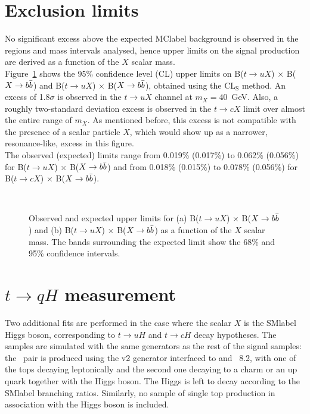 \clearpage

\section{Exclusion limits}

No significant excess above the expected \acrshort{MClabel} background is observed in the regions and mass intervals analysed, hence upper limits on the signal production are derived as a function of the $X$ scalar mass.\\

Figure~\ref{tqX:xseclimits} shows the 95\% confidence level (CL) upper limits on B($t\to uX$) $\times$ B($X\to b\bar{b}$) and B($t\to uX$) $\times$ B($X\to b\bar{b}$), obtained using the CL$_\text{S}$ method. An excess of 1.8$\sigma$ is observed in the $t\to uX$ channel at $m_X=40$~GeV. Also, a roughly two-standard deviation excess is observed in the $t\to cX$ limit over almost the entire range of $m_X$. As mentioned before, this excess is not compatible with the presence of a scalar particle $X$, which would show up as a narrower, resonance-like, excess in this figure.\\

The observed (expected) limits range from 0.019\% (0.017\%) to 0.062\% (0.056\%) for B($t\to uX$) $\times$ B($X\to b\bar{b}$) and from 0.018\% (0.015\%) to 0.078\% (0.056\%) for B($t\to cX$) $\times$ B($X\to b\bar{b}$).\\

\begin{figure}[htb]
    \RawFloats
    \centering
    \\
    \caption{Observed and expected upper limits for (a) B($t\to uX$) $\times$ B($X\to b\bar{b}$) and (b) B($t\to uX$) $\times$ B($X\to b\bar{b}$) as a function of the $X$ scalar mass. The bands surrounding the expected limit show the 68\% and 95\% confidence intervals.}
    \label{tqX:xseclimits}
\end{figure}

\section{$t\to qH$ measurement}

Two additional fits are performed in the case where the scalar $X$ is the \acrshort{SMlabel} Higgs boson, corresponding to $t\to uH$ and $t\to cH$ decay hypotheses. The samples are simulated with the same generators as the rest of the signal samples: the \ttbar\ pair is produced using the \POWHEGBOX v2 generator interfaced to \MADSPIN and \PYTHIA~8.2, with one of the tops decaying leptonically and the second one decaying to a charm or an up quark together with the Higgs boson. The Higgs is left to decay according to the \acrshort{SMlabel} branching ratios. Similarly, no sample of single top production in association with the Higgs boson is included.\\

